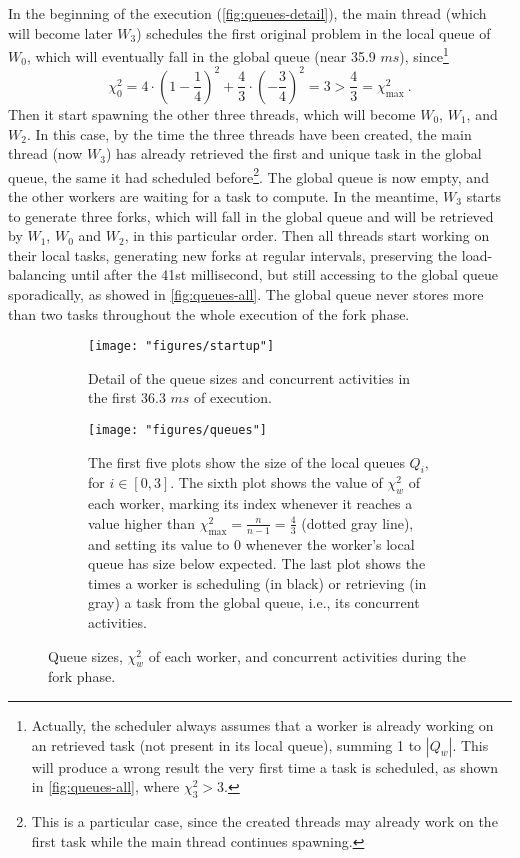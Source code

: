\documentclass[11pt, a4paper]{article}
\begin{document}
In the beginning of the execution (\autoref{fig:queues-detail}), the main thread (which will become later $W_3$) schedules the first original problem in the local queue of $W_0$, which will eventually fall in the global queue (near 35.9 $ms$), since\footnote{Actually, the scheduler always assumes that a worker is already working on an retrieved task (not present in its local queue), summing 1 to $|Q_w|$. This will produce a wrong result the very first time a task is scheduled, as shown in \autoref{fig:queues-all}, where $\chi^2_3 > 3$.} 
%
$$\chi^2_0 = 4\cdot\left(1 - \frac{1}{4}\right)^2 + \frac{4}{3}\cdot\left(-\frac{3}{4}\right)^2 = 3 > \frac{4}{3} = \chi^2_\text{max} \ .$$ 
%
Then it start spawning the other three threads, which will become $W_0$, $W_1$, and $W_2$. In this case, by the time the three threads have been created, the main thread (now $W_3$) has already retrieved the first and unique task in the global queue, the same it had scheduled before\footnote{This is a particular case, since the created threads may already work on the first task while the main thread continues spawning.}. The global queue is now empty, and the other workers are waiting for a task to compute. In the meantime, $W_3$ starts to generate three forks, which will fall in the global queue and will be retrieved by $W_1$, $W_0$ and $W_2$, in this particular order. Then all threads start working on their local tasks, generating new forks at regular intervals, preserving the load-balancing until after the 41st millisecond, but still accessing to the global queue sporadically, as showed in \autoref{fig:queues-all}. The global queue never stores more than two tasks throughout the whole execution of the fork phase.
%
\begin{figure}[t]
	\begin{subfigure}{\linewidth}
		\centering
		\texttt{[image: "figures/startup"]}
		\caption{Detail of the queue sizes and concurrent activities in the first 36.3 $ms$ of execution.}
		\label{fig:queues-detail}
	\end{subfigure}\vspace{2ex}
	\begin{subfigure}{\linewidth}
		\centering
		\texttt{[image: "figures/queues"]}
		\caption{The first five plots show the size of the local queues $Q_i$, for $i \in [0, 3]$. The sixth plot shows the value of $\chi^2_w$ of each worker, marking its index whenever it reaches a value higher than $\chi^2_\text{max} = \frac{n}{n-1} = \frac{4}{3}$ (dotted gray line), and setting its value to 0 whenever the worker's local queue has size below expected. The last plot shows the times a worker is scheduling (in black) or retrieving (in gray) a task from the global queue, i.e., its concurrent activities.}
		\label{fig:queues-all}
	\end{subfigure}
	\caption{Queue sizes, $\chi^2_w$ of each worker, and concurrent activities during the fork phase.}
	\label{fig:queues}
\end{figure}
\end{document}
